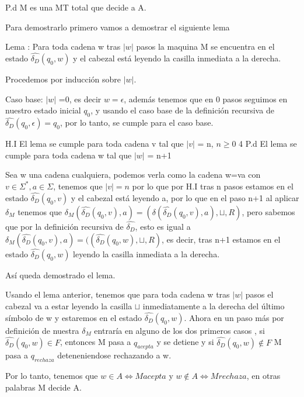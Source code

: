 \documentclass{article}
\begin{document}
\begin{enumerate}
  P.d M es una MT total que decide a A.

  Para demostrarlo primero vamos a demostrar el siguiente lema

  Lema : Para toda cadena w tras $|w|$ pasos la maquina M se encuentra en el estado $\widehat{\delta_D}(q_0,w)$ y el cabezal está leyendo la casilla inmediata a la derecha.

  Procedemos por inducción sobre $|w|$.

  Caso base: $|w|$ =0, es decir $w=\epsilon$, además tenemos que en 0 pasos seguimos en nuestro estado inicial $q_0$, y usando el caso base de la definición recursiva de $\widehat{\delta_D}(q_0,\epsilon)=q_0$, por lo tanto, se cumple para el caso base.

  H.I El lema se cumple para toda cadena v tal que $|v|$ = n, $n \geq 0$
4
  P.d El lema se cumple para toda cadena w tal que $|w|$ = n+1

  Sea w una cadena cualquiera, podemos verla como la cadena w=va con $v \in \Sigma^*, a \in \Sigma$, tenemos que $|v| = n$ por lo que por H.I tras n pasos estamos en el estado $\widehat{\delta_D}(q_0,v)$ y el cabezal está leyendo a, por lo que en el paso n+1 al aplicar $\delta_M$ tenemos que $\delta_M(\widehat{\delta_D}(q_0,v),a)= (\delta(\widehat{\delta_D}(q_0,v),a),\sqcup,R)$, pero sabemos que por la definición recursiva de $\widehat{\delta_D}$, esto es igual a $\delta_M(\widehat{\delta_D}(q_0,v),a)= ((\widehat{\delta_D}(q_0,w),\sqcup,R)$, es decir, tras n+1 estamos en el estado $\widehat{\delta_D}(q_0,w)$ leyendo la casilla inmediata a la derecha.

  Así queda demostrado el lema.


  Usando el lema anterior, tenemos que para toda cadena w tras $|w|$ pasos el cabezal va a estar leyendo la casilla $\sqcup$ inmediatamente a la derecha del último símbolo de w y estaremos en el estado $\widehat{\delta_D}(q_0,w)$. Ahora en un paso más por definición de nuestra $\delta_M$ entraría en alguno de los dos primeros casos , si $\widehat{\delta_D}(q_0,w) \in F$, entonces M pasa a $q_{acepta}$ y se detiene y si $\widehat{\delta_D}(q_0,w) \notin F$ M pasa a $q_{rechaza}$ deteneniendose rechazando a w. 

  Por lo tanto, tenemos que $w \in A \Leftrightarrow M acepta $ y $w \notin A \Leftrightarrow M rechaza $, en otras palabras M decide A.
  

  
  \end{enumerate}
\end{document}
